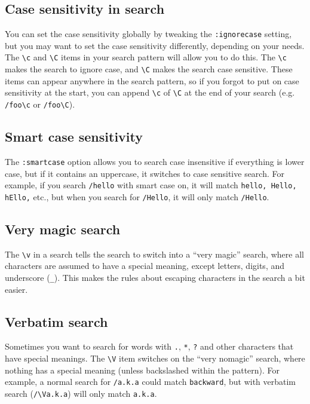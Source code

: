 \subsection{Case sensitivity in search}

You can set the case sensitivity globally by tweaking the \verb|:ignorecase| setting, but you may want to set the case sensitivity differently, depending on your needs.
The \verb|\c| and \verb|\C| items in your search pattern will allow you to do this.
The \verb|\c| makes the search to ignore case, and \verb|\C| makes the search case sensitive.
These items can appear anywhere in the search pattern, so if you forgot to put on case sensitivity at the start, you can append \verb|\c| of \verb|\C| at the end of your search (e.g. \verb|/foo\c| or \verb|/foo\C|).

\subsection{Smart case sensitivity}

The \verb|:smartcase| option allows you to search case insensitive if everything is lower case, but if it contains an uppercase, it switches to case sensitive search.
For example, if you search \verb|/hello| with smart case on, it will match \verb|hello, Hello, hEllo,| etc., but when you search for \verb|/Hello|, it will only match \verb|/Hello|.

\subsection{Very magic search}

The \verb|\v| in a search tells the search to switch into a ``very magic'' search, where all characters are assumed to have a special meaning, except letters, digits, and underscore (\verb|_|).
This makes the rules about escaping characters in the search a bit easier.

\subsection{Verbatim search}

Sometimes you want to search for words with \verb|.|, \verb|*|, \verb|?| and other characters that have special meanings.
The \verb|\V| item switches on the ``very nomagic'' search, where nothing has a special meaning (unless backslashed within the pattern).
For example, a normal search for \verb|/a.k.a| could match \verb|backward|, but with verbatim search (\verb|/\Va.k.a|) will only match \verb|a.k.a|.

